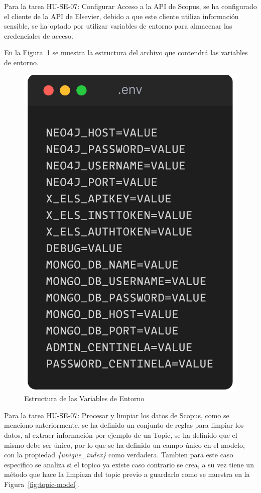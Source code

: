Para la tarea HU-SE-07: Configurar Acceso a la API de Scopus, se ha configurado el cliente de la API de Elsevier, debido a que
este cliente utiliza información sensible, se ha optado por utilizar variables de entorno para almacenar las credenciales de acceso.

En la Figura~\ref{fig:environment-variables} se muestra la estructura del archivo que contendrá las variables de entorno.

\begin{figure}[H]
    \centering
    \includegraphics[scale=0.12]{../02Figures/02Chapter/Sprints/Sprint-5/environment-variables.png}
    \caption{Estructura de las Variables de Entorno}\label{fig:environment-variables}
\end{figure}

Para la tarea HU-SE-07: Procesar y limpiar los datos de Scopus, como se menciono anteriormente, se ha definido un conjunto de reglas para limpiar los datos,
al extraer información por ejemplo de un Topic, se ha definido que el mismo debe ser único, por lo que se ha definido un campo único en el modelo,
con la propiedad \textit{\{unique\_index\}} como verdadera. Tambien para este caso especifico se analiza si el topico ya existe caso contrario se crea, a su vez
tiene un método que hace la limpieza del topic previo a guardarlo
como se muestra en la Figura~\ref{fig:topic-model}.

